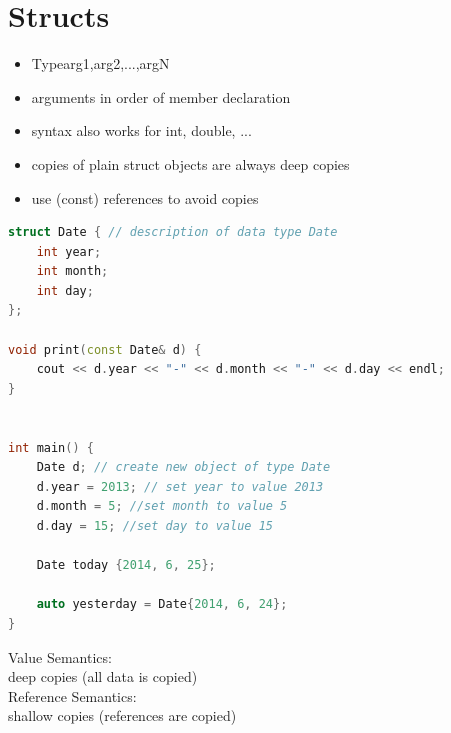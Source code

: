 \section{Structs}
\begin{itemize}
	\item Type{arg1,arg2,...,argN}
	\item arguments in order of member declaration
	\item syntax also works for int, double, ...
	\item copies of plain struct objects are always deep copies
	\item use (const) references to avoid copies
\end{itemize}
\begin{lstlisting}[language=C++]
struct Date { // description of data type Date
	int year;
	int month;
	int day;
};

void print(const Date& d) {
	cout << d.year << "-" << d.month << "-" << d.day << endl;
}


int main() {
	Date d; // create new object of type Date
	d.year = 2013; // set year to value 2013
	d.month = 5; //set month to value 5
	d.day = 15; //set day to value 15
	
	Date today {2014, 6, 25};
	
	auto yesterday = Date{2014, 6, 24};
}

\end{lstlisting}
Value Semantics:\\deep copies (all data is copied)\\
Reference Semantics:\\ shallow copies (references are copied)
